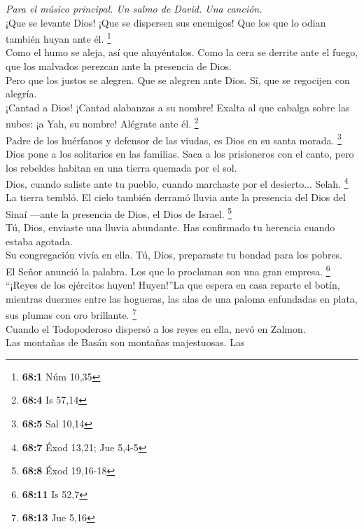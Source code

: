 \emph{Para el músico principal. Un salmo de David. Una canción.}\\
 ¡Que se levante Dios! ¡Que se dispersen sus enemigos! Que
los que lo odian también huyan ante él. \footnote{\textbf{68:1} Núm
  10,35}\\
 Como el humo se aleja, así que ahuyéntalos. Como la cera
se derrite ante el fuego, que los malvados perezcan ante la presencia de
Dios.\\
 Pero que los justos se alegren. Que se alegren ante Dios.
Sí, que se regocijen con alegría.\\
 ¡Cantad a Dios! ¡Cantad alabanzas a su nombre! Exalta al
que cabalga sobre las nubes: ¡a Yah, su nombre! Alégrate ante él.
\footnote{\textbf{68:4} Is 57,14}\\
 Padre de los huérfanos y defensor de las viudas, es Dios
en su santa morada. \footnote{\textbf{68:5} Sal 10,14}\\
 Dios pone a los solitarios en las familias. Saca a los
prisioneros con el canto, pero los rebeldes habitan en una tierra
quemada por el sol.\\
 Dios, cuando saliste ante tu pueblo, cuando marchaste por
el desierto... Selah. \footnote{\textbf{68:7} Éxod 13,21; Jue 5,4-5}\\
 La tierra tembló. El cielo también derramó lluvia ante la
presencia del Dios del Sinaí ---ante la presencia de Dios, el Dios de
Israel. \footnote{\textbf{68:8} Éxod 19,16-18}\\
 Tú, Dios, enviaste una lluvia abundante. Has confirmado
tu herencia cuando estaba agotada.\\
 Su congregación vivía en ella. Tú, Dios, preparaste tu
bondad para los pobres.\\
 El Señor anunció la palabra. Los que lo proclaman son
una gran empresa. \footnote{\textbf{68:11} Is 52,7}\\
 ``¡Reyes de los ejércitos huyen! Huyen!''La que espera
en casa reparte el botín,\\
 mientras duermes entre las hogueras, las alas de una
paloma enfundadas en plata, sus plumas con oro brillante. \footnote{\textbf{68:13}
  Jue 5,16}\\
 Cuando el Todopoderoso dispersó a los reyes en ella,
nevó en Zalmon.\\
 Las montañas de Basán son montañas majestuosas. Las
